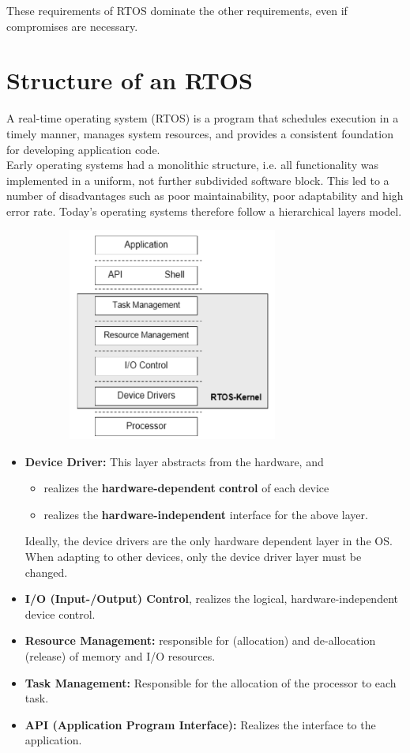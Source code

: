 These requirements of RTOS dominate the other requirements, even if compromises are necessary.

\section{Structure of an RTOS}

A real-time operating system (RTOS) is a program that schedules execution in a timely manner, manages system resources, and provides a consistent foundation for developing application code.\\

Early operating systems had a monolithic structure, i.e. all functionality was implemented in a uniform, not further subdivided software block. This led to a number of disadvantages such as poor maintainability, poor adaptability and high error rate. Today's operating systems therefore follow a hierarchical layers model. 

	\begin{figure}[h]
    \centering
    \includegraphics[width=9cm, height=7cm]{Images/image79.png}
    \label{fig:Fig 25}
    \end{figure}

\begin{itemize}
	\item  \textbf{Device Driver: } This layer abstracts from the hardware, and
	\begin{itemize}
		\item realizes the \textbf{hardware-dependent} \textbf{control} of each device
		\item realizes the \textbf{hardware-independent} interface for the above layer. 
	\end{itemize}

		Ideally, the device drivers are the only hardware dependent layer in the OS. When adapting to other devices, only the device driver layer must be changed.
	\item  \textbf{I/O (Input-/Output) Control}, realizes the logical, hardware-independent device control. 
	\item  \textbf{Resource Management: } responsible for (allocation) and de-allocation (release) of memory and I/O resources.
	\item  \textbf{Task Management: } Responsible for the allocation of the processor to each task. 
	\item  \textbf{API (Application Program Interface): } Realizes the interface to the application.
\end{itemize}

